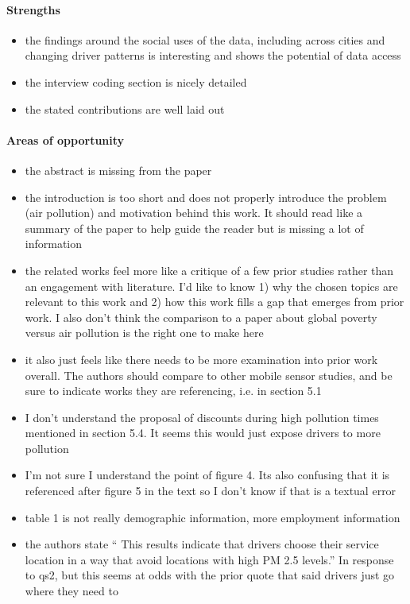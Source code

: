 \paragraph{Strengths}
\begin{itemize}
\item
the findings around the social uses of the data, including across cities and changing driver patterns is interesting and shows the potential of data access
\item
the interview coding section is nicely detailed
\item
the stated contributions are well laid out
\end{itemize}

\paragraph{Areas of opportunity}
\begin{itemize}
\item
the abstract is missing from the paper
\item
the introduction is too short and does not properly introduce the problem (air pollution) and motivation behind this work. It should read like a summary of the paper to help guide the reader but is missing a lot of information
\item
the related works feel more like a critique of a few prior studies rather than an engagement with literature. I’d like to know 1) why the chosen topics are relevant to this work and 2) how this work fills a gap that emerges from prior work. I also don’t think the comparison to a paper about global poverty versus air pollution is the right one to make here 
\item
it also just feels like there needs to be more examination into prior work overall. The authors should compare to other mobile sensor studies, and be sure to indicate works they are referencing, i.e.  in section 5.1 
\item
I don’t understand the proposal of discounts during high pollution times mentioned in section 5.4. It seems this would just expose drivers to more pollution 
\item
I’m not sure I understand the point of figure 4. Its also confusing that it is referenced after figure 5 in the text so I don’t know if that is a textual error 
\item 
table 1 is not really demographic information, more employment information
\item
the authors state “ This results indicate that drivers choose their service location in a way that avoid locations with high PM 2.5 levels.” In response to qs2, but this seems at odds with the prior quote that said drivers just go where they need to
\end{itemize}

